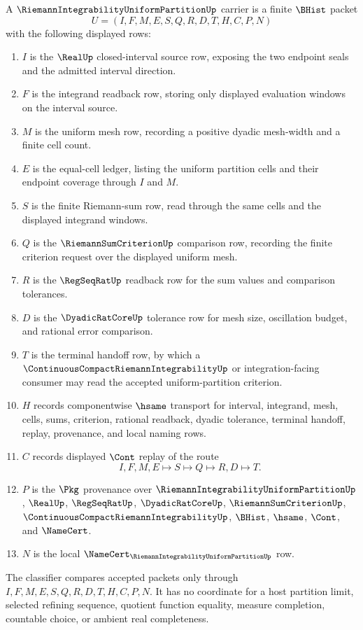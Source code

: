 \begin{definition}
\label{def:riemann-integrability-uniform-partition-carrier}
A $\RiemannIntegrabilityUniformPartitionUp$ carrier is a finite $\BHist$ packet
$$
U=(I,F,M,E,S,Q,R,D,T,H,C,P,N)
$$
with the following displayed rows:
\begin{enumerate}
\item $I$ is the $\RealUp$ closed-interval source row, exposing the two endpoint seals and the admitted interval direction.
\item $F$ is the integrand readback row, storing only displayed evaluation windows on the interval source.
\item $M$ is the uniform mesh row, recording a positive dyadic mesh-width and a finite cell count.
\item $E$ is the equal-cell ledger, listing the uniform partition cells and their endpoint coverage through $I$ and $M$.
\item $S$ is the finite Riemann-sum row, read through the same cells and the displayed integrand windows.
\item $Q$ is the $\RiemannSumCriterionUp$ comparison row, recording the finite criterion request over the displayed uniform mesh.
\item $R$ is the $\RegSeqRatUp$ readback row for the sum values and comparison tolerances.
\item $D$ is the $\DyadicRatCoreUp$ tolerance row for mesh size, oscillation budget, and rational error comparison.
\item $T$ is the terminal handoff row, by which a $\ContinuousCompactRiemannIntegrabilityUp$ or integration-facing consumer may read the accepted uniform-partition criterion.
\item $H$ records componentwise $\hsame$ transport for interval, integrand, mesh, cells, sums, criterion, rational readback, dyadic tolerance, terminal handoff, replay, provenance, and local naming rows.
\item $C$ records displayed $\Cont$ replay of the route
$$
I,F,M,E \longmapsto S \longmapsto Q \longmapsto R,D \longmapsto T .
$$
\item $P$ is the $\Pkg$ provenance over $\RiemannIntegrabilityUniformPartitionUp$, $\RealUp$, $\RegSeqRatUp$, $\DyadicRatCoreUp$, $\RiemannSumCriterionUp$, $\ContinuousCompactRiemannIntegrabilityUp$, $\BHist$, $\hsame$, $\Cont$, and $\NameCert$.
\item $N$ is the local $\NameCert_{\RiemannIntegrabilityUniformPartitionUp}$ row.
\end{enumerate}
The classifier compares accepted packets only through $I,F,M,E,S,Q,R,D,T,H,C,P,N$. It has no coordinate for a host partition limit, selected refining sequence, quotient function equality, measure completion, countable choice, or ambient real completeness.
\end{definition}

